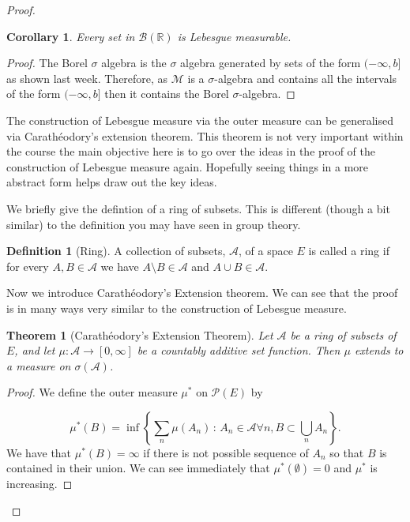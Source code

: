 \documentclass[
]{book}
\newtheorem{theorem}{Theorem}[chapter]
\newtheorem{corollary}{Corollary}[chapter]
\theoremstyle{definition}
\newtheorem{definition}{Definition}[chapter]
\theoremstyle{definition}
\theoremstyle{definition}
\theoremstyle{definition}
\theoremstyle{remark}
\begin{document}
\begin{proof}

\begin{corollary}
Every set in \(\mathcal{B}(\mathbb{R})\) is Lebesgue measurable.
\end{corollary}

\begin{proof}
The Borel \(\sigma\) algebra is the \(\sigma\) algebra generated by sets of the form \((-\infty, b]\) as shown last week. Therefore, as \(\mathscr{M}\) is a \(\sigma\)-algebra and contains all the intervals of the form \((-\infty, b]\) then it contains the Borel \(\sigma\)-algebra.
\end{proof}

The construction of Lebesgue measure via the outer measure can be generalised via Carathéodory's extension theorem. This theorem is not very important within the course the main objective here is to go over the ideas in the proof of the construction of Lebesgue measure again. Hopefully seeing things in a more abstract form helps draw out the key ideas.

We briefly give the defintion of a ring of subsets. This is different (though a bit similar) to the definition you may have seen in group theory.

\begin{definition}[Ring]
A collection of subsets, \(\mathcal{A}\), of a space \(E\) is called a ring if for every \(A,B \in \mathcal{A}\) we have \(A \setminus B \in \mathcal{A}\) and \(A \cup B \in \mathcal{A}\).
\end{definition}

Now we introduce Carathéodory's Extension theorem. We can see that the proof is in many ways very similar to the construction of Lebesgue measure.

\begin{theorem}[Carathéodory's Extension Theorem]
Let \(\mathcal{A}\) be a ring of subsets of \(E\), and let \(\mu: \mathcal{A} \rightarrow [0, \infty]\) be a countably additive set function. Then \(\mu\) extends to a measure on \(\sigma(\mathcal{A})\).
\end{theorem}

\begin{proof}
We define the outer measure \(\mu^*\) on \(\mathscr{P}(E)\) by

\[ \mu^*(B) = \inf \left\{ \sum_n \mu(A_n) \,:\, A_n \in \mathcal{A} \forall n, B \subset \bigcup_n A_n \right\}.\]
We have that \(\mu^*(B) = \infty\) if there is not possible sequence of \(A_n\) so that \(B\) is contained in their union. We can see immediately that \(\mu^*(\emptyset) =0\) and \(\mu^*\) is increasing.


\end{proof}
\end{proof}
\end{document}

